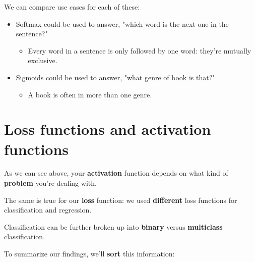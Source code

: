         \miniex We can compare use cases for each of these:
        
        \begin{itemize}
            \item Softmax could be used to answer, "which word is the next one in the sentence?"
                \begin{itemize}
                    \item Every word in a sentence is only followed by one word: they're mutually exclusive.
                \end{itemize}
            \item Sigmoids could be used to answer, "what genre of book is that?" 
                \begin{itemize}
                    \item A book is often in more than one genre.
                \end{itemize}
        \end{itemize}

        
    
        
    
\pagebreak
\section*{Loss functions and activation functions}

    As we can see above, your \textbf{activation} function depends on what kind of \textbf{problem} you're dealing with.
    
    The same is true for our \textbf{loss} function: we used \textbf{different} loss functions for classification and regression.
    
    Classification can be further broken up into \textbf{binary} versus \textbf{multiclass} classification.
    
    To summarize our findings, we'll \textbf{sort} this information:\\
    
